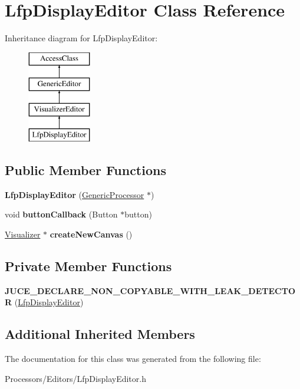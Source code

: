 \hypertarget{classLfpDisplayEditor}{\section{Lfp\-Display\-Editor Class Reference}
\label{classLfpDisplayEditor}
}
Inheritance diagram for Lfp\-Display\-Editor\-:\begin{figure}[H]
\begin{center}
\leavevmode
\includegraphics[height=4.000000cm]{classLfpDisplayEditor}
\end{center}
\end{figure}
\subsection*{Public Member Functions}
\begin{DoxyCompactItemize}
\item 
\hypertarget{classLfpDisplayEditor_a34f89fa14591e35a550261c57583f7fc}{{\bfseries Lfp\-Display\-Editor} (\hyperlink{classGenericProcessor}{Generic\-Processor} $\ast$)}\label{classLfpDisplayEditor_a34f89fa14591e35a550261c57583f7fc}

\item 
\hypertarget{classLfpDisplayEditor_a01b41c6ea44cafb27348520f14c1cf23}{void {\bfseries button\-Callback} (Button $\ast$button)}\label{classLfpDisplayEditor_a01b41c6ea44cafb27348520f14c1cf23}

\item 
\hypertarget{classLfpDisplayEditor_a86fa96fccccff6b684cb088cde7c08c0}{\hyperlink{classVisualizer}{Visualizer} $\ast$ {\bfseries create\-New\-Canvas} ()}\label{classLfpDisplayEditor_a86fa96fccccff6b684cb088cde7c08c0}

\end{DoxyCompactItemize}
\subsection*{Private Member Functions}
\begin{DoxyCompactItemize}
\item 
\hypertarget{classLfpDisplayEditor_af060c2d187023c967b9df63424b4b838}{{\bfseries J\-U\-C\-E\-\_\-\-D\-E\-C\-L\-A\-R\-E\-\_\-\-N\-O\-N\-\_\-\-C\-O\-P\-Y\-A\-B\-L\-E\-\_\-\-W\-I\-T\-H\-\_\-\-L\-E\-A\-K\-\_\-\-D\-E\-T\-E\-C\-T\-O\-R} (\hyperlink{classLfpDisplayEditor}{Lfp\-Display\-Editor})}\label{classLfpDisplayEditor_af060c2d187023c967b9df63424b4b838}

\end{DoxyCompactItemize}
\subsection*{Additional Inherited Members}


The documentation for this class was generated from the following file\-:\begin{DoxyCompactItemize}
\item 
Processors/\-Editors/Lfp\-Display\-Editor.\-h\end{DoxyCompactItemize}
